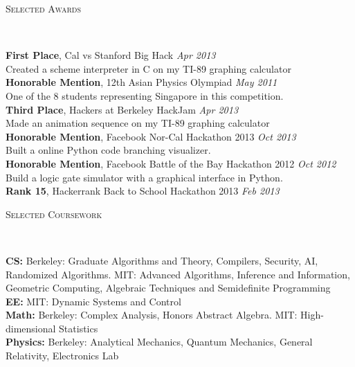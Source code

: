 \documentclass[9pt]{article}
\newenvironment{changemargin}[2]{%
  \begin{list}{}{%
      \setlength{\topsep}{0pt}%
      \setlength{\leftmargin}{#1}%
      \setlength{\rightmargin}{#2}%
      \setlength{\listparindent}{\parindent}%
      \setlength{\itemindent}{\parindent}%
      \setlength{\parsep}{\parskip}%
    }%
  \item[]}{\end{list}
}
\newcommand{\lineover}{
  \begin{changemargin}{-0.05in}{-0.05in}
    \vspace*{-8pt}
    \hrulefill \\
    \vspace*{-2pt}
  \end{changemargin}
}
\newcommand{\header}[1]{
  \begin{changemargin}{-0.5in}{-0.5in}
    \scshape{#1}\\
    \lineover
  \end{changemargin}
}
\newenvironment{body} {
  \vspace*{-16pt}
  \begin{changemargin}{-0.25in}{-0.5in}
  }
  {\end{changemargin}
}
\begin{document}
\header{Selected Awards}
\begin{body}
  \vspace{14pt}
  \textbf{First Place}, Cal vs Stanford Big Hack \hfill{} \emph{Apr 2013}\\
  Created a scheme interpreter in C on my TI-89 graphing calculator \\
  \textbf{Honorable Mention}, 12th Asian Physics Olympiad \hfill{} \emph{May 2011}\\
  One of the 8 students representing Singapore in this competition.\\
  \textbf{Third Place}, Hackers at Berkeley HackJam \hfill{} \emph{Apr 2013}\\
  Made an animation sequence on my TI-89 graphing calculator \\
  \textbf{Honorable Mention}, Facebook Nor-Cal Hackathon 2013 \hfill{} \emph{Oct 2013}\\
  Built a online Python code branching visualizer.\\
  \textbf{Honorable Mention}, Facebook Battle of the Bay Hackathon 2012 \hfill{} \emph{Oct 2012}\\
  Build a logic gate simulator with a graphical interface in Python. \\
  \textbf{Rank 15}, Hackerrank Back to School Hackathon 2013 \hfill{} \emph{Feb 2013}\\
\end{body}

\smallskip

\header{Selected Coursework}
\begin{body}
  \vspace{14pt}

  \textbf{CS:} Berkeley: Graduate Algorithms and Theory, Compilers, Security, AI, Randomized Algorithms. MIT: Advanced Algorithms, Inference and Information, Geometric Computing, Algebraic Techniques and Semidefinite Programming \\
  \textbf{EE:} MIT: Dynamic Systems and Control \\
  \medskip
  \textbf{Math:} Berkeley: Complex Analysis, Honors Abstract Algebra. MIT: High-dimensional Statistics \\
  \medskip
  \textbf{Physics:} Berkeley: Analytical Mechanics, Quantum Mechanics, General Relativity, Electronics Lab \\
  \medskip
\end{body}
\end{document}
